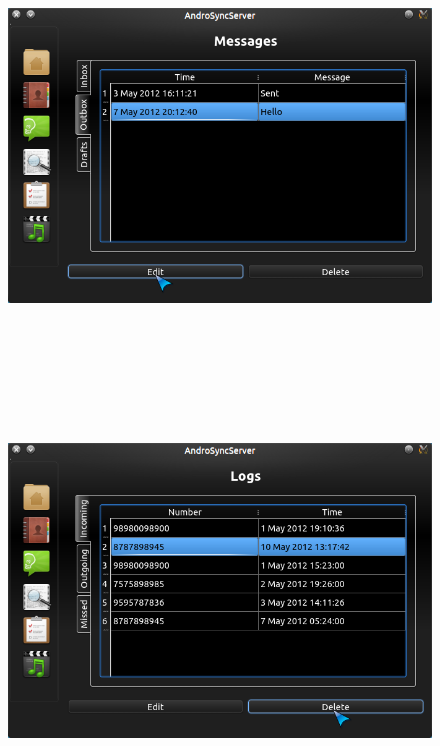 \begin{figure}[H]
  \centering
    \includegraphics[height= 11cm, width=17cm]{project/images/AndroSyncServer/AndroSyncServer_MsgOutbox}
\end{figure}
\newpage
\begin{figure}[H]
  \centering
    \includegraphics[height= 11cm, width=17cm]{project/images/AndroSyncServer/AndroSyncServer_CallLogsIn}
\end{figure}
\vspace{1cm}
